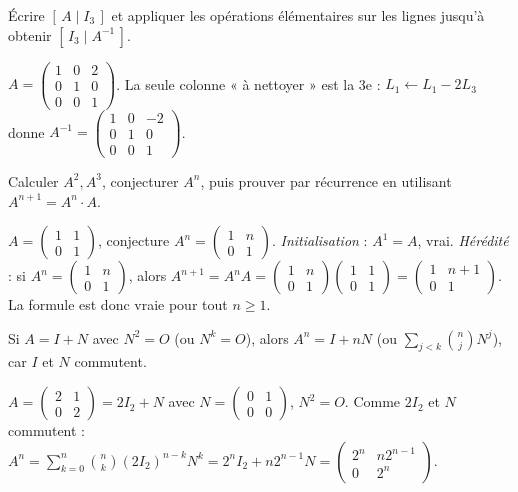 Écrire $[\,A\mid I_3\,]$ et appliquer les opérations élémentaires sur les lignes jusqu'à
obtenir $[\,I_3\mid A^{-1}\,]$.
\begin{exemple}
$A=\begin{pmatrix}1&0&2\\0&1&0\\0&0&1\end{pmatrix}$. La seule colonne « à nettoyer » est la 3e :
$L_1\leftarrow L_1-2L_3$ donne $A^{-1}=\begin{pmatrix}1&0&-2\\0&1&0\\0&0&1\end{pmatrix}$.
\end{exemple}

Calculer $A^2,A^3$, conjecturer $A^n$, puis prouver par récurrence en utilisant $A^{n+1}=A^n\cdot A$.
\begin{exemple}
$A=\begin{pmatrix}1&1\\0&1\end{pmatrix}$, conjecture $A^n=\begin{pmatrix}1&n\\0&1\end{pmatrix}$.
\emph{Initialisation} : $A^1=A$, vrai. \emph{Hérédité} : si $A^n=\begin{pmatrix}1&n\\0&1\end{pmatrix}$,
alors $A^{n+1}=A^n A=\begin{pmatrix}1&n\\0&1\end{pmatrix}\begin{pmatrix}1&1\\0&1\end{pmatrix}
=\begin{pmatrix}1&n+1\\0&1\end{pmatrix}$. La formule est donc vraie pour tout $n\ge1$.
\end{exemple}

Si $A=I+N$ avec $N^2=O$ (ou $N^k=O$), alors $A^n=I+nN$ (ou $\sum_{j<k}\binom nj N^j$), car $I$ et $N$ commutent.
\begin{exemple}
$A=\begin{pmatrix}2&1\\0&2\end{pmatrix}=2I_2+N$ avec $N=\begin{pmatrix}0&1\\0&0\end{pmatrix}$, $N^2=O$.
Comme $2I_2$ et $N$ commutent : $A^n=\sum_{k=0}^n\binom nk(2I_2)^{n-k}N^k=2^nI_2+n2^{n-1}N
=\begin{pmatrix}2^n&n2^{n-1}\\0&2^n\end{pmatrix}$.
\end{exemple}

